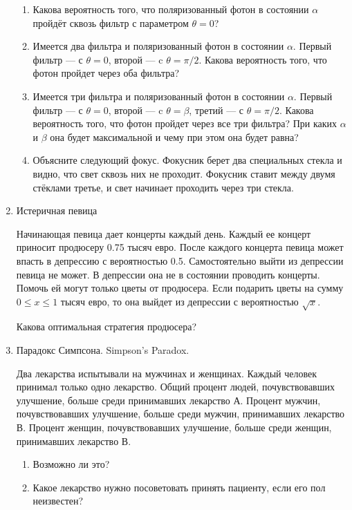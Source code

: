 \documentclass[nobib]{tufte-handout}
\begin{document}
\begin{enumerate}
\begin{enumerate}
\item Какова вероятность того, что поляризованный фотон в состоянии $\alpha$ пройдёт сквозь фильтр с параметром $\theta=0$?
\item Имеется два фильтра и поляризованный фотон в состоянии $\alpha$. Первый фильтр --- с $\theta=0$, второй --- c $\theta=\pi/2$. Какова вероятность того, что фотон пройдет через оба фильтра?
\item Имеется три фильтра и поляризованный фотон в состоянии $\alpha$. Первый фильтр --- с $\theta=0$, второй --- c $\theta=\beta$, третий --- с $\theta=\pi/2$. Какова вероятность того, что фотон пройдет через все три фильтра? При каких $\alpha$ и $\beta$ она будет максимальной и чему при этом она будет равна?
\item Объясните следующий фокус. Фокусник берет два специальных стекла и видно, что свет сквозь них не проходит. Фокусник ставит между двумя стёклами третье, и свет начинает проходить через три стекла. 
\end{enumerate}


\item Истеричная певица

Начинающая певица дает концерты каждый день. Каждый ее концерт приносит продюсеру 0.75 тысяч евро. После каждого концерта певица может впасть в депрессию с вероятностью 0.5. Самостоятельно выйти из депрессии певица не может. В депрессии она не в состоянии проводить концерты. Помочь ей могут только цветы от продюсера. Если подарить цветы на сумму $0\le x\le 1$ тысяч евро, то она выйдет из депрессии с вероятностью $\sqrt{x}$. 

Какова оптимальная стратегия продюсера? 

\item Парадокс Симпсона.  Simpson's Paradox.

Два лекарства испытывали на мужчинах и женщинах. Каждый
человек принимал только одно лекарство. Общий процент людей,
почувствовавших улучшение, больше среди принимавших лекарство А.
Процент мужчин, почувствовавших улучшение, больше среди мужчин, принимавших лекарство В. Процент женщин, почувствовавших улучшение, больше среди женщин, принимавших лекарство В. 

\begin{enumerate}
\item Возможно ли это?
\item Какое лекарство нужно посоветовать принять пациенту, если его пол неизвестен?
\end{enumerate}
 


\end{enumerate}
\end{document}
